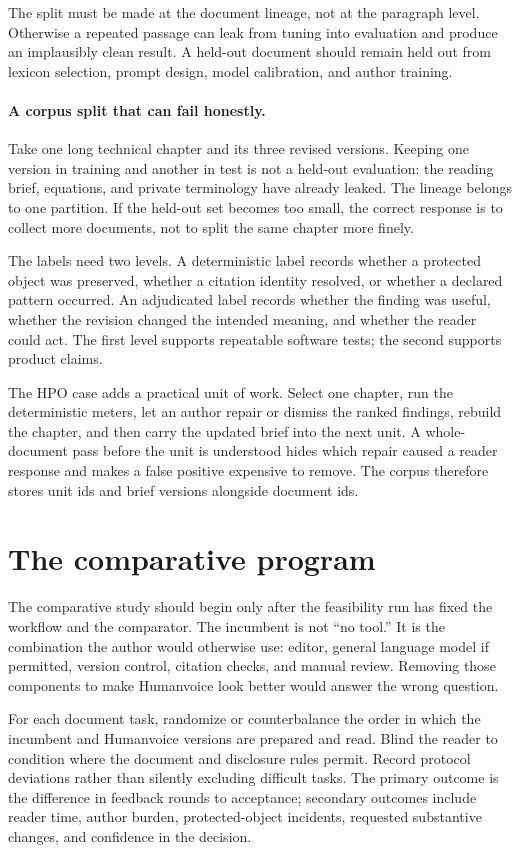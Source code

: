 The split must be made at the document lineage, not at the paragraph level.
Otherwise a repeated passage can leak from tuning into evaluation and produce
an implausibly clean result. A held-out document should remain held out from
lexicon selection, prompt design, model calibration, and author training.

\paragraph{A corpus split that can fail honestly.}
Take one long technical chapter and its three revised versions. Keeping one
version in training and another in test is not a held-out evaluation: the
reading brief, equations, and private terminology have already leaked. The
lineage belongs to one partition. If the held-out set becomes too small, the
correct response is to collect more documents, not to split the same chapter
more finely.

The labels need two levels. A deterministic label records whether a protected
object was preserved, whether a citation identity resolved, or whether a
declared pattern occurred. An adjudicated label records whether the finding
was useful, whether the revision changed the intended meaning, and whether the
reader could act. The first level supports repeatable software tests; the
second supports product claims.

The HPO case adds a practical unit of work. Select one chapter, run the
deterministic meters, let an author repair or dismiss the ranked findings,
rebuild the chapter, and then carry the updated brief into the next unit. A
whole-document pass before the unit is understood hides which repair caused a
reader response and makes a false positive expensive to remove. The corpus
therefore stores unit ids and brief versions alongside document ids.

\section{The comparative program}

The comparative study should begin only after the feasibility run has fixed
the workflow and the comparator. The incumbent is not ``no tool.'' It is the
combination the author would otherwise use: editor, general language model if
permitted, version control, citation checks, and manual review. Removing those
components to make Humanvoice look better would answer the wrong question.

For each document task, randomize or counterbalance the order in which the
incumbent and Humanvoice versions are prepared and read. Blind the reader to
condition where the document and disclosure rules permit. Record protocol
deviations rather than silently excluding difficult tasks. The primary outcome
is the difference in feedback rounds to acceptance; secondary outcomes include
reader time, author burden, protected-object incidents, requested substantive
changes, and confidence in the decision.

